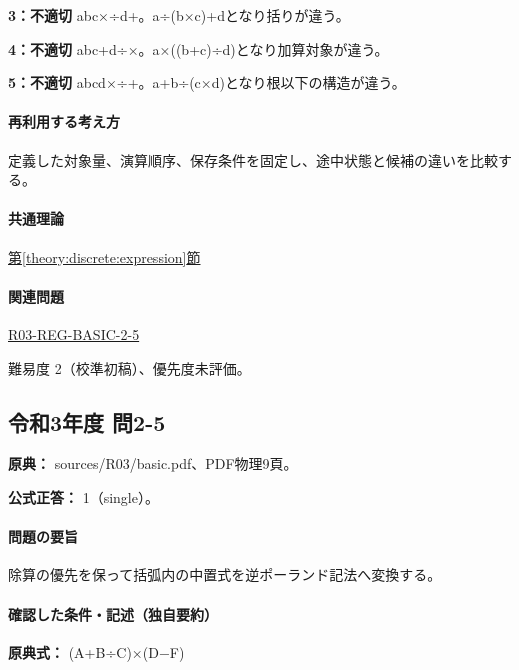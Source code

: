 \noindent\textbf{3：不適切} abc×÷d+。a÷(b×c)+dとなり括りが違う。\par

\noindent\textbf{4：不適切} abc+d÷×。a×((b+c)÷d)となり加算対象が違う。\par

\noindent\textbf{5：不適切} abcd×÷+。a+b÷(c×d)となり根以下の構造が違う。\par

\paragraph{再利用する考え方} 定義した対象量、演算順序、保存条件を固定し、途中状態と候補の違いを比較する。

\paragraph{共通理論} \hyperref[theory:discrete:expression]{第\ref*{theory:discrete:expression}節}

\paragraph{関連問題} \hyperref[q:r03-reg-basic-2-5]{R03-REG-BASIC-2-5}

\par 難易度 2（校準初稿）、優先度未評価。

\subsection{令和3年度 問2-5}
\label{q:r03-reg-basic-2-5}

\noindent\textbf{原典：} sources/R03/basic.pdf、PDF物理9頁。

\textbf{公式正答：} 1（single）。

\paragraph{問題の要旨} 除算の優先を保って括弧内の中置式を逆ポーランド記法へ変換する。

\paragraph{確認した条件・記述（独自要約）}\mbox{}\par

\noindent\textbf{原典式：} (A+B÷C)×(D−F)\par

